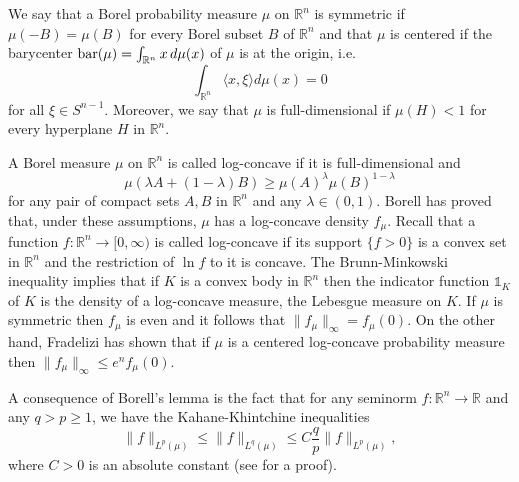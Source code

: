 \documentclass[11pt,leqno]{article}
\theoremstyle{definition}
\theoremstyle{remark}
\numberwithin{equation}{section}
\newcommand{\ls}{\leqslant}
\newcommand{\gr}{\geqslant}
\newcommand{\1}{\textbf{1}}
\begin{document}
We say that a Borel probability measure $\mu $ on $\mathbb{R}^n$ is symmetric if $\mu (-B)=\mu (B)$ for every Borel subset $B$
of ${\mathbb R}^n$ and that $\mu $ is centered if the barycenter ${\rm bar}(\mu)=\int_{\mathbb{R}^n}x\,d\mu(x)$ of $\mu$ is at the origin, i.e.
\begin{equation*}\int_{\mathbb R^n} \langle x, \xi \rangle d\mu(x)= 0\end{equation*}
for all $\xi\in S^{n-1}$. Moreover, we say that $\mu$ is full-dimensional if $\mu(H)<1$ for every
hyperplane $H$ in ${\mathbb R}^n$.

A Borel measure $\mu$ on $\mathbb R^n$ is called log-concave if it is full-dimensional and
$$\mu(\lambda A+(1-\lambda)B) \gr \mu(A)^{\lambda}\mu(B)^{1-\lambda}$$
for any pair of compact sets $A,B$ in ${\mathbb R}^n$ and any $\lambda \in (0,1)$. Borell \cite{Borell-1974} has proved that, under these assumptions, $\mu $ has a log-concave density $f_{{\mu }}$. Recall that a function $f:\mathbb R^n \rightarrow [0,\infty)$ is called log-concave if its support $\{f>0\}$ is a convex set in ${\mathbb R}^n$ and the restriction of $\ln{f}$ to it is concave. The Brunn-Minkowski inequality implies that if $K$ is a convex body in $\mathbb R^n$ then the indicator function $\mathds{1}_{K} $ of $K$ is the density of a log-concave measure, the Lebesgue measure on $K$. If $\mu$ is symmetric then $f_{\mu}$ is even and it follows that $\|f_{\mu}\|_{\infty}=f_{\mu}(0)$. On the other hand, Fradelizi \cite{Fradelizi-1997} has shown that if $\mu $ is a centered log-concave probability measure then $\|f_{\mu }\|_{\infty }\ls e^nf_{\mu }(0)$.

A consequence of Borell's lemma \cite[Lemma~2.4.5]{BGVV-book} is the fact that for any seminorm
$f:\mathbb{R}^n\to \mathbb{R}$ and any $q>p\gr 1$, we have the Kahane-Khintchine inequalities
\begin{equation}\label{eq:kahane}\|f\|_{L^p(\mu)}\ls \|f\|_{L^q(\mu)}\ls C\frac{q}{p}\|f\|_{L^p(\mu)},\end{equation}
where $C>0$ is an absolute constant (see \cite[Theorem~2.4.6]{BGVV-book} for a proof).
\end{document}
